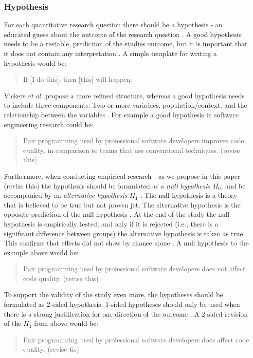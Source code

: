 \subsubsection{Hypothesis}

For each quantitative research question there should be a hypothesis - an educated guess about the outcome of the research question \cite{Buddies2010,Farrugia2009}. A good hypothesis needs to be a testable, prediction of the studies outcome, but it is important that it does not contain any interpretation \cite{Prasad2001}. A simple template for writing a hypothesis would be:
\begin{quote}
	If [I do this], then [this] will happen. \cite{Buddies2010}
\end{quote}
Vickers \emph{et al.} propose a more refined structure, whereas a good hypothesis needs to include three components: Two or more variables, population/context, and the relationship between the variables \cite{Vickers}.  For example a good hypothesis in software engineering research could be: 
\begin{quote}
	{\color{red}Pair programming used by professional software developers improves code quality, in comparison to teams that use conventional techniques. (revise this)}
\end{quote}
Furthermore, when conducting empirical research {\color{red}- as we propose in this paper - (revise this)} the hypothesis should be formulated as a \emph{null hypothesis $H_0$}, and be accompanied by an \emph{alternative hypothesis $H_1$} \cite{Farrugia2009}. The null hypothesis is a theory that is believed to be true but not proven jet. The alternative hypothesis is the opposite prediction of the null hypothesis \cite{Prasad2001}. At the end of the study the null hypothesis is empirically tested, and only if it is rejected (i.e., there is a significant difference between groups) the alternative hypothesis is taken as true. This confirms that effects did not show by chance alone \cite{Farrugia2009}. A null hypothesis to the example above would be:
\begin{quote}
	{\color{red}Pair programming used by professional software developers does not affect code quality. (revise this)}
\end{quote}
To support the validity of the study even more, the hypotheses should be formulated as 2-sided hypothesis. \cite[p.280]{Farrugia2009} 1-sided hypotheses should only be used when there is a strong justification for one direction of the outcome \cite{Farrugia2009}. A 2-sided revision of the $H_1$ from above would be: 
\begin{quote}
	{\color{red}Pair programming used by professional software developers does affect code quality. (revise tis)}	
\end{quote}
